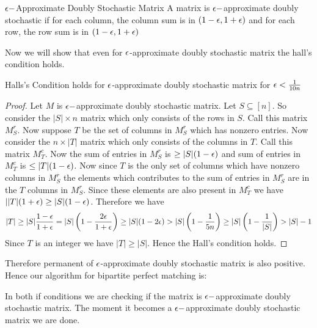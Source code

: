 \begin{Definition}{$\epsilon-$Approximate Doubly Stochastic Matrix}{}
	A  matrix is $\epsilon-$approximate doubly stochastic if for each column, the column sum is in $(1-\epsilon,1+\epsilon)$ and  for each row, the row sum is in $(1-\epsilon,1+\epsilon)$
\end{Definition}

Now we will show that even for $\epsilon$-approximate doubly stochastic matrix the hall's condition holds.
\begin{lemma}{}{}
	Halls's Condition holds for $\epsilon$-approximate doubly stochastic matrix for $\epsilon<\frac1{10n}$
\end{lemma}
\begin{proof}
	Let $M$ is $\epsilon-$approximate doubly stochastic matrix. Let $S\subseteq [n]$. So consider the $|S|\times n$ matrix which only consists of the rows in $S$. Call this matrix $M_S^r$. Now suppose $T$ be the set of columns in $M_S^r$ which has nonzero entries. Now consider the $n\times |T|$ matrix which only consists of the columns in $T$. Call this matrix $M_T^c$. Now the sum of entries in $M_S^r$ is $\geq |S|(1-\epsilon)$ and sum of entries in $M_T^c$ is $\leq |T|(1-\epsilon)$. Now since $T$ is the only set of columns which have nonzero columns in $M_S^r$ the elements which contributes to the sum of entries in $M_S^r$ are in the  $T$ columns in $M_S^r$. Since these elements are also present in $M_T^c$ we have $||T|(1+\epsilon)\geq |S|(1-\epsilon)$. Therefore we have $$|T|\geq |S|\frac{1-\epsilon}{1+\epsilon}=|S|\left(1-\frac{2\epsilon}{1+\epsilon}\right)\geq |S|(1-2\epsilon)>|S|\left(1-\frac1{5n}\right)\geq |S|\left(1-\frac1{|S|}\right)>|S|-1$$Since $T$ is an integer we have $|T|\geq |S|$. Hence the Hall's condition holds. 
\end{proof}

Therefore permanent of $\epsilon$-approximate doubly stochastic matrix is also positive. Hence our algorithm for bipartite perfect matching is:
\begin{algorithm}
	\DontPrintSemicolon
{}
\caption{}
\end{algorithm}


In both if conditions we are checking if the matrix is $\epsilon-$approximate doubly stochastic matrix. The moment it becomes a $\epsilon-$approximate doubly stochastic matrix we are done. 

